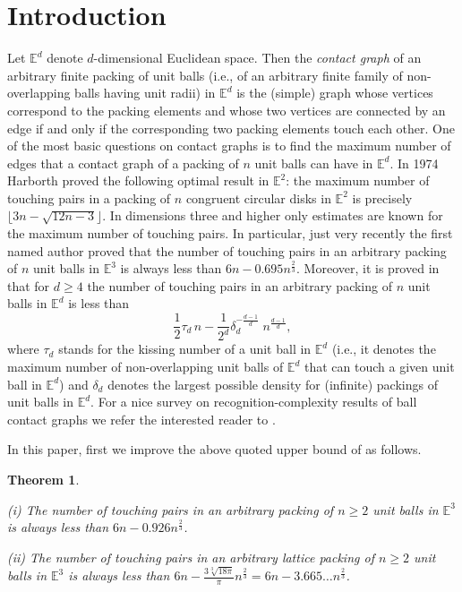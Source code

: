 \documentclass[10pt]{article}
\newtheorem{Theorem}{Theorem}
\numberwithin{Subcase}{Case}
\begin{document}
\section{Introduction}
Let $\mathbb{E}^{d}$ denote $d$-dimensional Euclidean space. Then the {\it contact graph} of an arbitrary finite packing of unit balls (i.e., of an arbitrary finite family of non-overlapping balls having unit radii) in $\mathbb{E}^{d}$ is the (simple) graph whose vertices correspond to the packing elements and whose two vertices are connected by an edge if and only if the corresponding two packing elements touch each other. One of the most basic questions on contact graphs is to find the maximum number of edges that a contact graph of a packing of $n$ unit balls can have in $\mathbb{E}^{d}$. In 1974 Harborth \cite{Ha} proved the following optimal result in $\mathbb{E}^{2}$: the maximum number of touching pairs in a packing of $n$ congruent circular disks in $\mathbb{E}^{2}$ is precisely $\lfloor 3n-\sqrt{12n-3}\rfloor$. In dimensions three and higher only estimates are known for the maximum number of touching pairs. In particular, just very recently the first named author \cite{B12} proved that the number of touching pairs in an arbitrary packing of $n$ unit balls in $\mathbb{E}^{3}$ is always less than $6n-0.695n^{\frac{2}{3}}$. Moreover, it is proved in \cite{B02} that for $d\ge4$ the number of touching pairs in an arbitrary packing of $n$ unit balls in $\mathbb{E}^{d}$ is less than
$$\frac{1}{2}\tau_d\, n-\frac{1}{2^{d}}\delta_d^{-\frac{d-1}{d}}\; n^{\frac{d-1}{d}},$$
where $\tau_d$ stands for the kissing number of a unit ball in $\mathbb{E}^{d}$ (i.e., it denotes the maximum number of non-overlapping unit balls of $\mathbb{E}^{d}$ that can touch a given unit ball in $\mathbb{E}^{d}$) and $\delta_d$ denotes the largest possible density for (infinite) packings of unit balls in $\mathbb{E}^{d}$. For a nice survey on recognition-complexity results of ball contact graphs we refer the interested reader to \cite{HK01}.

In this paper, first we improve the above quoted upper bound of \cite{B12} as follows.

\bigskip

\begin{Theorem}\label{improved-estimate}
\item (i)
The number of touching pairs in an arbitrary packing of $n\ge 2$ unit balls in $\mathbb{E}^{3}$ is always less than $6n-0.926n^{\frac{2}{3}}$.
\item (ii)
The number of touching pairs in an arbitrary lattice packing of $n\ge 2$ unit balls in $\mathbb{E}^{3}$ is always less than $ 6n-\frac{3\sqrt[3]{18\pi}}{\pi}n^{\frac{2}{3}}=6n-3.665\dots n^{\frac{2}{3}}$.

\end{Theorem}
\end{document}

